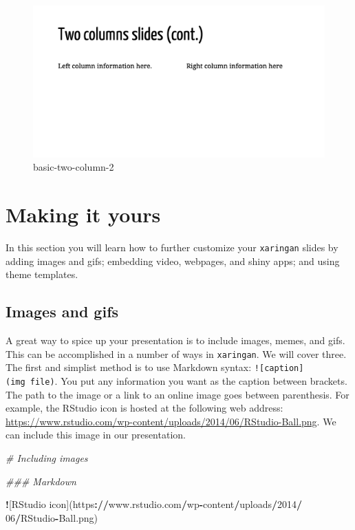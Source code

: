 \documentclass[
]{book}
\newenvironment{Shaded}{\begin{snugshade}}{\end{snugshade}}
\newcommand{\CommentTok}[1]{\textcolor[rgb]{0.37,0.37,0.37}{\textit{#1}}}
\newcommand{\DecValTok}[1]{\textcolor[rgb]{0.06,0.06,0.06}{#1}}
\newcommand{\ErrorTok}[1]{\textcolor[rgb]{0.14,0.14,0.14}{\textbf{#1}}}
\newcommand{\NormalTok}[1]{#1}
\newcommand{\OperatorTok}[1]{\textcolor[rgb]{0.43,0.43,0.43}{\textbf{#1}}}
\begin{document}
\begin{figure}
\centering
\includegraphics{img/02_basics-two-column_2.png}
\caption{basic-two-column-2}
\end{figure}

\hypertarget{making-it-yours}{%
\section{Making it yours}\label{making-it-yours}}

In this section you will learn how to further customize your \texttt{xaringan} slides by adding images and gifs; embedding video, webpages, and shiny apps; and using theme templates.

\hypertarget{images-and-gifs}{%
\subsection{Images and gifs}\label{images-and-gifs}}

A great way to spice up your presentation is to include images, memes, and gifs. This can be accomplished in a number of ways in \texttt{xaringan}. We will cover three. The first and simplist method is to use Markdown syntax: \texttt{!{[}caption{]}(img\ file)}. You put any information you want as the caption between brackets. The path to the image or a link to an online image goes between parenthesis. For example, the RStudio icon is hosted at the following web address: \url{https://www.rstudio.com/wp-content/uploads/2014/06/RStudio-Ball.png}. We can include this image in our presentation.

\begin{Shaded}
\begin{Highlighting}[]
\CommentTok{# Including images}

\CommentTok{### Markdown}

\OperatorTok{!}\NormalTok{[RStudio icon](https}\OperatorTok{:}\ErrorTok{//}\NormalTok{www.rstudio.com}\OperatorTok{/}\NormalTok{wp}\OperatorTok{-}\NormalTok{content}\OperatorTok{/}\NormalTok{uploads}\OperatorTok{/}\DecValTok{2014}\OperatorTok{/}
\DecValTok{06}\OperatorTok{/}\NormalTok{RStudio}\OperatorTok{-}\NormalTok{Ball.png)}
\end{Highlighting}
\end{Shaded}
\end{document}
